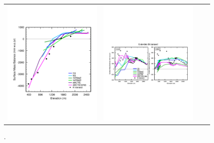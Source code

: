 \documentclass[draft]{agujournal2019}
\begin{document}
\begin{figure}[t]
\begin{center}
\begin{tabular}{cccc}
         \includegraphics[width=60mm]{figs/temp_zsmb_ktrans_obsperiod.pdf}&
         \includegraphics[width=60mm]{figs/temp_zsmb_btrans_obsperiod.pdf} \\
\end{tabular}
\end{center}
\caption{.}
\label{fig:prect}
\end{figure}




\end{document}
